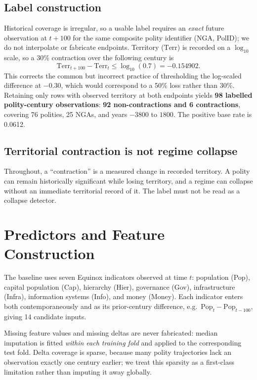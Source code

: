 \documentclass[conference]{IEEEtran}
\begin{document}
\subsection{Label construction}
Historical coverage is irregular, so a usable label requires an \emph{exact}
future observation at $t{+}100$ for the same composite polity identifier
(NGA, PolID); we do not interpolate or fabricate endpoints. Territory
($\mathrm{Terr}$) is recorded on a $\log_{10}$ scale, so a 30\% contraction
over the following century is
\begin{equation}
\mathrm{Terr}_{t+100} - \mathrm{Terr}_{t} \le \log_{10}(0.7) = -0.154902 .
\end{equation}
This corrects the common but incorrect practice of thresholding the log-scaled
difference at $-0.30$, which would correspond to a 50\% loss rather than 30\%.
Retaining only rows with observed territory at both endpoints yields
\textbf{98 labelled polity-century observations}: \textbf{92 non-contractions
and 6 contractions}, covering 76 polities, 25 NGAs, and years $-3800$ to
$1800$. The positive base rate is 0.0612.

\subsection{Territorial contraction is not regime collapse}
Throughout, a ``contraction'' is a measured change in recorded territory. A
polity can remain historically significant while losing territory, and a regime
can collapse without an immediate territorial record of it. The label must not
be read as a collapse detector.

\section{Predictors and Feature Construction}
The baseline uses seven Equinox indicators observed at time $t$: population
(Pop), capital population (Cap), hierarchy (Hier), governance (Gov),
infrastructure (Infra), information systems (Info), and money (Money). Each
indicator enters both contemporaneously and as its prior-century difference,
e.g.\ $\mathrm{Pop}_t - \mathrm{Pop}_{t-100}$, giving 14 candidate inputs.

Missing feature values and missing deltas are never fabricated: median
imputation is fitted \emph{within each training fold} and applied to the
corresponding test fold. Delta coverage is sparse, because many polity
trajectories lack an observation exactly one century earlier; we treat this
sparsity as a first-class limitation rather than imputing it away globally.
\end{document}
